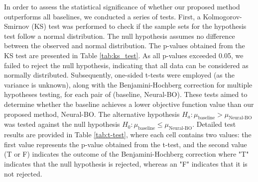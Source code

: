 In order to assess the statistical significance of whether our proposed method outperforms all baselines, we conducted a series of tests. First, a Kolmogorov-Smirnov (KS) test was performed to check if the sample sets for the hypothesis test follow a normal distribution. The null hypothesis assumes no difference between the observed and normal distribution. The p-values obtained from the KS test are presented in Table \ref{tab:ks_test}.  As all p-values exceeded 0.05, we failed to reject the null hypothesis, indicating that all data can be considered as normally distributed. Subsequently, one-sided t-tests were employed (as the variance is unknown), along with the Benjamini-Hochberg correction for multiple hypotheses testing, for each pair of (baseline, Neural-BO). These tests aimed to determine whether the baseline achieves a lower objective function value than our proposed method, Neural-BO. The alternative hypothesis $H_a: \mu_\text{baseline} > \mu_{\text{Neural-BO}}$ was tested against the null hypothesis $H_0: \mu_\text{baseline} \le \mu_{\text{Neural-BO}}$. Detailed test results are provided in Table \ref{tab:t-test}, where each cell contains two values: the first value represents the p-value obtained from the t-test, and the second value (T or F) indicates the outcome of the Benjamini-Hochberg correction where "T" indicates that the null hypothesis is rejected, whereas an "F" indicates that it is not rejected.








